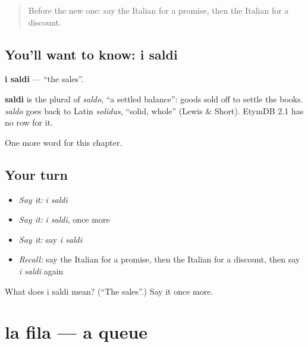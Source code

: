 \label{lesson:IT-C197-saldi}



\begin{quote}
Before the new one: say the Italian for a promise, then the Italian for a discount.
\end{quote}

\subsection*{You'll want to know: i saldi}
\textbf{i saldi} — \textquotedblleft{}the sales\textquotedblright{}.

\begin{cousinweb}
\textbf{saldi} is the plural of \emph{saldo}, \textquotedblleft{}a settled balance\textquotedblright{}: goods sold off to settle the books. \emph{saldo} goes back to Latin \emph{solidus}, \textquotedblleft{}solid, whole\textquotedblright{} (Lewis \& Short). EtymDB 2.1 has no row for it.
\end{cousinweb}

\begin{grammarlens}[title={What you've built}]
One more word for this chapter.
\end{grammarlens}

\subsection*{Your turn}
\begin{itemize}
\raggedright
  \item \emph{Say it:} \emph{i saldi}
  \item \emph{Say it:} \emph{i saldi}, once more
  \item \emph{Say it:} say \emph{i saldi}
  \item \emph{Recall:} say the Italian for a promise, then the Italian for a discount, then say \emph{i saldi} again
\end{itemize}

\begin{tcolorbox}[breakable,colback=teal!4,colframe=teal!35!black,title={Before you move on}]
What does i saldi mean? (\textquotedblleft{}The sales\textquotedblright{}.) Say it once more.
\end{tcolorbox}
\section[la fila]{la fila — a queue}

\label{lesson:IT-C197-fila}



